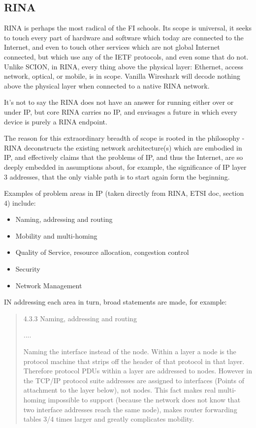 \subsection{RINA}

RINA is perhaps the most radical of the FI schools.  Its scope is universal, it seeks to touch every part of hardware and software which today are connected to the Internet, and even to touch other services which are not global Internet connected, but which use any of the IETF protocols, and even some that do not.
Unlike SCION, in RINA, every thing above the physical layer: Ethernet, access network, optical, or mobile, is in scope.  Vanilla Wireshark will decode nothing above the physical layer when connected to a native RINA network.

It's not to say the RINA does not have an answer for running either over or under IP, but core RINA carries no IP, and envisages a future in which every device is purely a RINA endpoint.

The reason for this extraordinary breadth of scope is rooted in the philosophy - RINA deconstructs the existing network architecture(s) which are embodied in IP, and effectively claims that the problems of IP, and thus the Internet, are so deeply embedded in assumptions about, for example, the significance of IP layer 3 addresses, that the only viable path is to start again form the beginning.

Examples of problem areas in IP (taken directly from RINA, ETSI doc, section 4) include:

\begin{itemize}
    \item Naming, addressing and routing
    \item Mobility and multi-homing
    \item Quality of Service, resource allocation, congestion control
    \item Security
    \item Network Management
\end{itemize}

IN addressing each area in turn, broad statements are made, for example:
\begin{quote}
4.3.3 Naming, addressing and routing 

....

    Naming the interface instead of the node. Within a layer a node is the protocol machine that strips off the header of
that protocol in that layer. Therefore protocol PDUs within a layer are addressed to nodes. However in the TCP/IP
protocol suite addresses are assigned to interfaces (Points of attachment to the layer below), not nodes. This fact makes
real multi-homing impossible to support (because the network does not know that two interface addresses reach the
same node), makes router forwarding tables 3/4 times larger and greatly complicates mobility. 
\end{quote}

